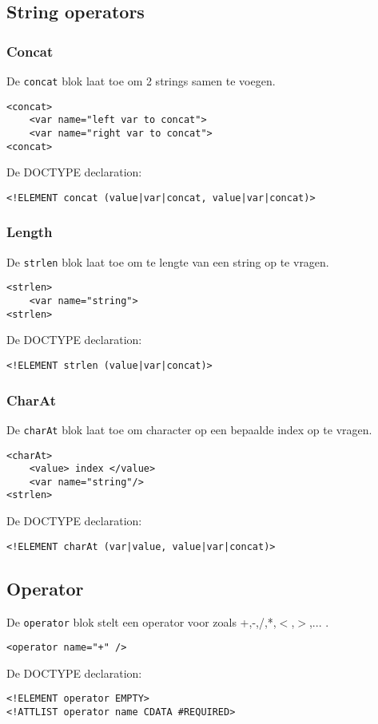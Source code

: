 \documentclass[]{article}
\begin{document}
\subsection{String operators}
\subsubsection{Concat}
De \texttt{concat} blok laat toe om 2 strings samen te voegen.
\lstset{language=XML}
\begin{lstlisting}
<concat>
	<var name="left var to concat">
	<var name="right var to concat">
<concat>
\end{lstlisting}
De DOCTYPE declaration: 
\lstset{language=XML}
\begin{lstlisting}
<!ELEMENT concat (value|var|concat, value|var|concat)>
\end{lstlisting}

\subsubsection{Length}
De \texttt{strlen} blok laat toe om te lengte van een string op te vragen.
\lstset{language=XML}
\begin{lstlisting}
<strlen>
	<var name="string">
<strlen>
\end{lstlisting}
De DOCTYPE declaration: 
\lstset{language=XML}
\begin{lstlisting}
<!ELEMENT strlen (value|var|concat)>
\end{lstlisting}

\subsubsection{CharAt}
De \texttt{charAt} blok laat toe om character op een bepaalde index op te vragen.
\lstset{language=XML}
\begin{lstlisting}
<charAt>
	<value> index </value>
	<var name="string"/>
<strlen>
\end{lstlisting}
De DOCTYPE declaration: 
\lstset{language=XML}
\begin{lstlisting}
<!ELEMENT charAt (var|value, value|var|concat)>
\end{lstlisting}

\subsection{Operator}
De \texttt{operator} blok stelt een operator voor zoals +,-,/,*,$<$,$>$,... . 
\lstset{language=XML}
\begin{lstlisting}
<operator name="+" />
\end{lstlisting}
De DOCTYPE declaration: 
\lstset{language=XML}
\begin{lstlisting}
<!ELEMENT operator EMPTY>
<!ATTLIST operator name CDATA #REQUIRED>
\end{lstlisting}
\end{document}
